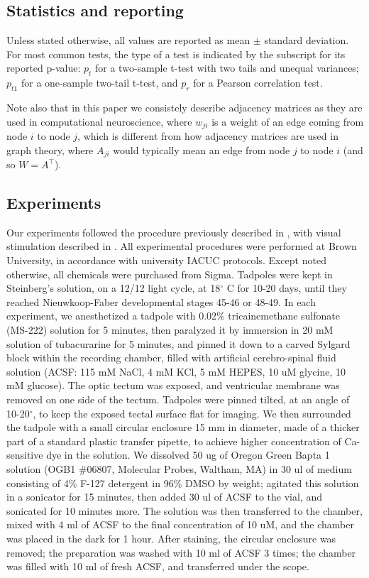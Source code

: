 \documentclass{article}
\begin{document}
\subsection*{Statistics and reporting}

Unless stated otherwise, all values are reported as mean $\pm$ standard deviation. For most common tests, the type of a test is indicated by the subscript for its reported p-value: $p_t$ for a two-sample t-test with two tails and unequal variances; $p_{t1}$ for a one-sample two-tail t-test, and $p_r$ for a Pearson correlation test.

Note also that in this paper we consistely describe adjacency matrices as they are used in computational neuroscience, where $w_{ji}$ is a weight of an edge coming from node $i$ to node $j$, which is different from how adjacency matrices are used in graph theory, where $A_{ji}$ would typically mean an edge from node $j$ to node $i$ (and so $W = A^\top$).

\subsection*{Experiments}

Our experiments followed the procedure previously described in \citep{xu2011,truszkowski2017}, with visual stimulation described in \citep{khakhalin2014}. All experimental procedures were performed at Brown University, in accordance with university IACUC protocols. Except noted otherwise, all chemicals were purchased from Sigma. Tadpoles were kept in Steinberg’s solution, on a 12/12 light cycle, at 18$^\circ$ C for 10-20 days, until they reached Nieuwkoop-Faber developmental stages 45-46 or 48-49. In each experiment, we anesthetized a tadpole with 0.02\% tricainemethane sulfonate (MS-222) solution for 5 minutes, then paralyzed it by immersion in 20 mM solution of tubacurarine for 5 minutes, and pinned it down to a carved Sylgard block within the recording chamber, filled with artificial cerebro-spinal fluid solution (ACSF: 115 mM NaCl, 4 mM KCl, 5 mM HEPES, 10 uM glycine, 10 mM glucose). The optic tectum was exposed, and ventricular membrane was removed on one side of the tectum. Tadpoles were pinned tilted, at an angle of 10-20$^\circ$, to keep the exposed tectal surface flat for imaging. We then surrounded the tadpole with a small circular enclosure 15 mm in diameter, made of a thicker part of a standard plastic transfer pipette, to achieve higher concentration of Ca-sensitive dye in the solution. We dissolved 50 ug of Oregon Green Bapta 1 solution (OGB1 $\#$06807, Molecular Probes, Waltham, MA) in 30 ul of medium consisting of 4\% F-127 detergent in 96\% DMSO by weight; agitated this solution in a sonicator for 15 minutes, then added 30 ul of ACSF to the vial, and sonicated for 10 minutes more. The solution was then transferred to the chamber, mixed with 4 ml of ACSF to the final concentration of 10 uM, and the chamber was placed in the dark for 1 hour. After staining, the circular enclosure was removed; the preparation was washed with 10 ml of ACSF 3 times; the chamber was filled with 10 ml of fresh ACSF, and transferred under the scope.
\end{document}
